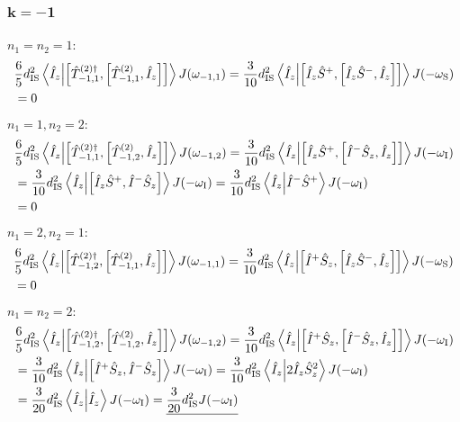 \begin{appendixtext}
\subsubsection{$\mathbf{k = -1}$}
$n_1 = n_2 = 1$:
\begin{align*}
&\frac{6}{5} d_{\text{IS}}^2 \bra{\hat{I}_z} \ket{\comm{\hat{T}_{-1, 1}^{(2) \dagger}}{\comm{\hat{T}_{-1,1}^{(2)}}{\hat{I}_z}}} J(\omega_{-1,1}) = \frac{3}{10} d_{\text{IS}}^2 \bra{\hat{I}_z} \ket{\comm{\hat{I}_z \hat{S}^+}{\comm{\hat{I}_z \hat{S}^-}{\hat{I}_z}}} J(- \omega_{\text{S}}) \\
&= 0
\end{align*}
$n_1 = 1, n_2 = 2$:
\begin{align*}
&\frac{6}{5} d_{\text{IS}}^2 \bra{\hat{I}_z} \ket{\comm{\hat{T}_{-1, 1}^{(2) \dagger}}{\comm{\hat{T}_{-1,2}^{(2)}}{\hat{I}_z}}} J(\omega_{-1,2}) = \frac{3}{10} d_{\text{IS}}^2 \bra{\hat{I}_z} \ket{\comm{\hat{I}_z \hat{S}^+}{\comm{\hat{I}^- \hat{S}_z}{\hat{I}_z}}} J(- \omega_{\text{I}}) \\
&= \frac{3}{10} d_{\text{IS}}^2 \bra{\hat{I}_z} \ket{\comm{\hat{I}_z \hat{S}^+}{\hat{I}^- \hat{S}_z}} J(- \omega_{\text{I}}) =  \frac{3}{10} d_{\text{IS}}^2 \bra{\hat{I}_z} \ket{\hat{I}^- \hat{S}^+} J(- \omega_{\text{I}}) \\
& = 0
\end{align*}
$n_1 = 2, n_2 = 1$:
\begin{align*}
&\frac{6}{5} d_{\text{IS}}^2 \bra{\hat{I}_z} \ket{\comm{\hat{T}_{-1, 2}^{(2) \dagger}}{\comm{\hat{T}_{-1,1}^{(2)}}{\hat{I}_z}}} J(\omega_{-1,1}) = \frac{3}{10} d_{\text{IS}}^2 \bra{\hat{I}_z} \ket{\comm{\hat{I}^+ \hat{S}_z}{\comm{\hat{I}_z \hat{S}^-}{\hat{I}_z}}} J(- \omega_{\text{S}}) \\
&= 0
\end{align*}
$n_1 = n_2 = 2$:
\begin{align*}
&\frac{6}{5} d_{\text{IS}}^2 \bra{\hat{I}_z} \ket{\comm{\hat{T}_{-1, 2}^{(2) \dagger}}{\comm{\hat{T}_{-1,2}^{(2)}}{\hat{I}_z}}} J(\omega_{-1,2}) = \frac{3}{10} d_{\text{IS}}^2 \bra{\hat{I}_z} \ket{\comm{\hat{I}^+ \hat{S}_z}{\comm{\hat{I}^- \hat{S}_z}{\hat{I}_z}}} J(- \omega_{\text{I}}) \\
&= \frac{3}{10} d_{\text{IS}}^2 \bra{\hat{I}_z} \ket{\comm{\hat{I}^+ \hat{S}_z}{\hat{I}^- \hat{S}_z}} J(- \omega_{\text{I}}) = \frac{3}{10} d_{\text{IS}}^2 \bra{\hat{I}_z} \ket{2 \hat{I}_z \hat{S}_z^2} J(- \omega_{\text{I}}) \\
&= \frac{3}{20} d_{\text{IS}}^2 \bra{\hat{I}_z} \ket{\hat{I}_z} J(- \omega_{\text{I}}) = \underline{\frac{3}{20} d_{\text{IS}}^2 J(- \omega_{\text{I}})}
\end{align*}

\end{appendixtext}
